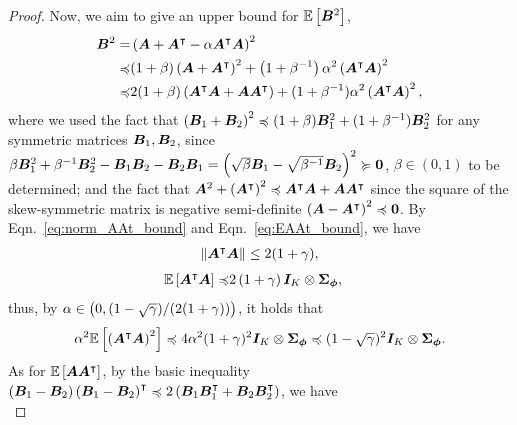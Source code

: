 \begin{proof}
Now, we aim to give an upper bound for ${\mathbb E}\left[{{\bm{B}}^2}\right]$,
\begin{equation*}
\begin{aligned}
    {\bm{B}}^2=&\left({{\bm{A}}+{\bm{A}}^{\intercal}-\alpha{\bm{A}}^{\intercal}{\bm{A}}}\right)^2\\
    \preccurlyeq& (1+\beta)\left({{\bm{A}}+{\bm{A}}^{\intercal}}\right)^2+\left({1+\beta^{-1}}\right)\alpha^2\left({{\bm{A}}^{\intercal}{\bm{A}}}\right)^2\\
    \preccurlyeq&2(1+\beta)\left({{\bm{A}}^{\intercal}{\bm{A}}+{\bm{A}}{\bm{A}}^{\intercal}}\right)+(1+\beta^{-1})\alpha^2\left({{\bm{A}}^{\intercal}{\bm{A}}}\right)^2,
\end{aligned}
\end{equation*}
where we used the fact that $\left({{\bm{B}}_1+{\bm{B}}_2}\right)^2\preccurlyeq (1+\beta){\bm{B}}_1^2+(1+\beta^{-1}){\bm{B}}_2^2$ for any symmetric matrices ${\bm{B}}_1,{\bm{B}}_2$, since $\beta{\bm{B}}_1^2+\beta^{-1}{\bm{B}}_2^2-{\bm{B}}_1{\bm{B}}_2-{\bm{B}}_2{\bm{B}}_1=\left({\sqrt{\beta}{\bm{B}}_1-\sqrt{\beta^{-1}}{\bm{B}}_2}\right)^2\succcurlyeq \bm{0}$, $\beta\in (0, 1)$ to be determined; and the fact that   ${\bm{A}}^2+\left({{\bm{A}}^{\intercal}}\right)^2\preccurlyeq{\bm{A}}^{\intercal}{\bm{A}}+{\bm{A}}{\bm{A}}^{\intercal}$ since the square of the skew-symmetric matrix is negative semi-definite $\left({{\bm{A}}-{\bm{A}}^{\intercal}}\right)^2\preccurlyeq \bm{0}$.
By Eqn.~\eqref{eq:norm_AAt_bound} and Eqn.~\eqref{eq:EAAt_bound}, we have
\begin{equation*}
\begin{aligned}
    \left\|{{\bm{A}}^{\intercal}{\bm{A}}}\right\|\leq 2(1+\gamma),
\end{aligned}
\end{equation*}
\begin{equation}\label{eq:upper_bound_B_part_1}
\begin{aligned}
    {\mathbb E}\left[{{\bm{A}}^{\intercal}{\bm{A}}}\right]\preccurlyeq&2\left({1+\gamma}\right){\bm{I}}_K\otimes{\bm{\Sigma}}_{{\bm{\phi}}},
\end{aligned}
\end{equation}
thus, by $\alpha\in\left({0,(1-\sqrt\gamma)/(2(1+\gamma))}\right)$, it holds that
\begin{equation}\label{eq:upper_bound_B_part_2}
\begin{aligned}
    \alpha^2{\mathbb E}\left[{\left({{\bm{A}}^{\intercal}{\bm{A}}}\right)^2}\right]\preccurlyeq4\alpha^2(1+\gamma)^2{\bm{I}}_K\otimes{\bm{\Sigma}}_{{\bm{\phi}}}\preccurlyeq (1-\sqrt\gamma)^2 {\bm{I}}_K\otimes{\bm{\Sigma}}_{{\bm{\phi}}}.
\end{aligned}
\end{equation}
As for ${\mathbb E}\left[{{\bm{A}}{\bm{A}}^{\intercal}}\right]$, by the basic inequality $\left({{\bm{B}}_1-{\bm{B}}_2}\right)\left({{\bm{B}}_1-{\bm{B}}_2}\right)^{\intercal}\preccurlyeq 2\left({{\bm{B}}_1{\bm{B}}_1^{\intercal}+{\bm{B}}_2{\bm{B}}_2^{\intercal}}\right)$, we have
\begin{equation*}

\end{equation*}
\end{proof}
